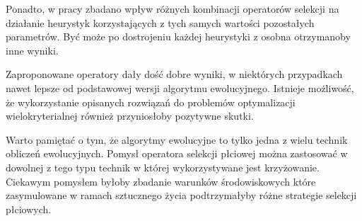 \documentclass[./FM_mgr.tex]{subfiles}
\begin{document}
Ponadto, w pracy zbadano wpływ różnych kombinacji operatorów selekcji na działanie heurystyk korzystających z tych samych wartości pozostałych parametrów.
Być może po dostrojeniu każdej heurystyki z osobna otrzymanoby inne wyniki.

Zaproponowane operatory dały dość dobre wyniki, w niektórych przypadkach nawet lepsze od podstawowej wersji algorytmu ewolucyjnego.
Istnieje możliwość, że wykorzystanie opisanych rozwiązań do problemów optymalizacji wielokryterialnej również przyniosłoby pozytywne skutki.

Warto pamiętać o tym, że algorytmy ewolucyjne to tylko jedna z wielu technik obliczeń ewolucyjnych.
Pomysł operatora selekcji płciowej można zastosować w dowolnej z tego typu technik w której wykorzystywane jest krzyżowanie.
Ciekawym pomysłem byłoby zbadanie warunków środowiskowych które zasymulowane w ramach sztucznego życia podtrzymałyby różne strategie selekcji płciowych.
\end{document}
